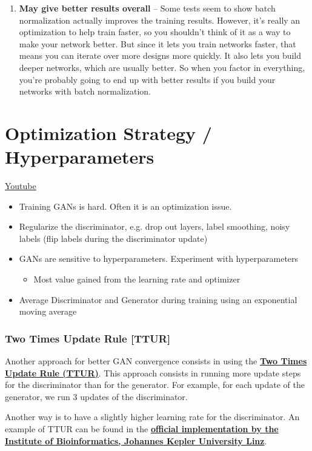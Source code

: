 \begin{enumerate}
    \item \textbf{May give better results overall} – Some tests seem to show batch normalization actually improves the training results. However, it's really an optimization to help train faster, so you shouldn't think of it as a way to make your network better. But since it lets you train networks faster, that means you can iterate over more designs more quickly. It also lets you build deeper networks, which are usually better. So when you factor in everything, you're probably going to end up with better results if you build your networks with batch normalization.
\end{enumerate}

\section{Optimization Strategy / Hyperparameters}
\href{https://www.youtube.com/watch?v=0Im7Nfs2o4k&t=1s}{Youtube} \newline

\begin{itemize}
    \item Training GANs is hard. Often it is an optimization issue.
    \item Regularize the discriminator, e.g. drop out layers, label smoothing, noisy labels (flip labels during the discriminator update)
    \item GANs are sensitive to hyperparameters. Experiment with hyperparameters
    \begin{itemize}
        \item Most value gained from the learning rate and optimizer
    \end{itemize}
    \item Average Discriminator and Generator during training using an exponential moving average
\end{itemize}
\subsubsection{Two Times Update Rule [TTUR]}
Another approach for better GAN convergence consists in using the \href{https://arxiv.org/pdf/1706.08500.pdf}{\textbf{Two Times Update Rule (TTUR)}}. This approach consists in running more update steps for the discriminator than for the generator. For example, for each update of the generator, we run 3 updates of the discriminator.\newline

Another way is to have a slightly higher learning rate for the discriminator. An example of TTUR can be found in the \href{https://github.com/bioinf-jku/TTUR/blob/master/WGAN_GP/gan_64x64_FID.py\#L44}{\textbf{official implementation by the Institute of Bioinformatics, Johannes Kepler University Linz}}.

